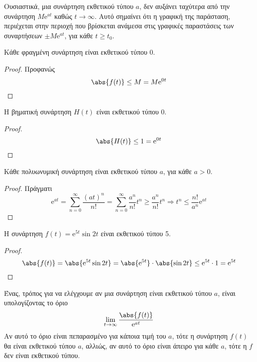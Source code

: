 \begin{rem}
  Ουσιαστικά, μια συνάρτηση εκθετικού τύπου $a$, δεν αυξάνει ταχύτερα από την 
  συνάρτηση $ M \mathrm{e}^{at} $ καθώς $ t \to \infty $. Αυτό σημαίνει ότι η 
  γραφική της παράσταση, περιέχεται στην περιοχή που βρίσκεται ανάμεσα στις 
  γραφικές παραστάσεις των συναρτήσεων 
  $ \pm M \mathrm{e}^{at}$, για κάθε $ t \geq t_{0} $.
\end{rem}

\begin{prop}
  Κάθε φραγμένη συνάρτηση είναι εκθετικού τύπου 0.
\end{prop}
\begin{proof}
  Προφανώς
  \[
    \abs{f(t)} \leq M = M \mathrm{e}^{0t}
  \] 
\end{proof}

\begin{example}
  Η βηματική συνάρτηση $ H(t) $ είναι εκθετικού τύπου 0.
  \begin{proof}
    \[
      \abs{H(t)} \leq 1 = \mathrm{e}^{0t} 
    \] 
  \end{proof}
\end{example}

\begin{prop}
  Κάθε πολυωνυμική συνάρτηση είναι εκθετικού τύπου $a$, για κάθε $ a>0 $.
\end{prop}
\begin{proof}
  Πράγματι
  \[
    \mathrm{e}^{at} = \sum_{n=0}^{\infty} \frac{(at)^{n}}{n!} = \sum_{n=0}^{\infty} 
    \frac{a^{n}}{n!} t^{n} \geq \frac{a^{n}}{n!} t^{n} \Rightarrow t^{n} \leq
    \frac{n!}{a^{n}} \mathrm{e}^{at}
  \]
\end{proof}

\begin{example}
  Η συνάρτηση $ f(t) = \mathrm{e}^{5t} \sin{2t} $ είναι εκθετικού τύπου 5.
  \begin{proof}
    \[
      \abs{f(t)} = \abs{\mathrm{e}^{5t} \sin{2t}} = \abs{\mathrm{e}^{5t}} \cdot 
      \abs{\sin{2t}} \leq \mathrm{e}^{5t} \cdot 1 = \mathrm{e}^{5t}
    \] 
  \end{proof}
\end{example}

\begin{rem}
  Ένας, τρόπος για να ελέγχουμε αν μια συνάρτηση είναι εκθετικού τύπου $a$, είναι 
  υπολογίζοντας το όριο
  \[
    \lim_{t \to \infty} \frac{\abs{f(t)}}{\mathrm{e}^{at}} 
  \] 
  Αν αυτό το όριο είναι πεπαρασμένο για κάποια τιμή του $a$, τότε η συνάρτηση $ f(t)
  $ θα είναι εκθετικού τύπου $a$, αλλιώς, αν αυτό το όριο είναι άπειρο για κάθε $a$, 
  τότε η $f$ δεν είναι εκθετικού τύπου.
\end{rem}

